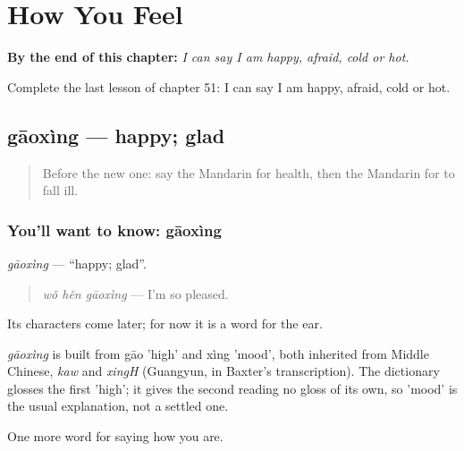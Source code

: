 
\chapter{How You Feel}
\label{ch:zh-how-you-feel}

\begin{chapteropening}
\textbf{By the end of this chapter:} \emph{I can say I am happy, afraid, cold or hot.}

Complete the last lesson of chapter 51: I can say I am happy, afraid, cold or hot.
\end{chapteropening}

\section[gāoxìng]{gāoxìng — happy; glad}

\label{lesson:ZH-C51-gaoxing}



\begin{quote}
Before the new one: say the Mandarin for health, then the Mandarin for to fall ill.
\end{quote}

\subsection*{You'll want to know: gāoxìng}
\emph{gāoxìng} — \textquotedblleft{}happy; glad\textquotedblright{}.

\begin{quote}
\emph{wǒ hěn gāoxìng} — I'm so pleased.
\end{quote}

Its characters come later; for now it is a word for the ear.

\begin{cousinweb}
\emph{gāoxìng} is built from gāo 'high' and xìng 'mood', both inherited from Middle Chinese, \emph{kaw} and \emph{xingH} (Guangyun, in Baxter's transcription). The dictionary glosses the first 'high'; it gives the second reading no gloss of its own, so 'mood' is the usual explanation, not a settled one.
\end{cousinweb}

\begin{grammarlens}[title={What you've built}]
One more word for saying how you are.
\end{grammarlens}

